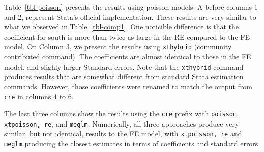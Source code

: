 \documentclass[bib]{statapress}
\begin{document}
Table~\ref{tbl-poisson} presents the results using poisson models. A
before columns 1 and 2, represent Stata's official implementation. These
results are very similar to what we observed in Table~\ref{tbl-comp1}.
One noticible difference is that the coefficient for south is more than
twice as large in the RE compared to the FE model. On Column 3, we
present the results using \texttt{xthybrid} (community contributed
command). The coefficients are almost identical to those in the FE
model, and slighly larger Standard errors. Note that the
\texttt{xthybrid} command produces results that are somewhat different
from standard Stata estimation commands. However, those coefficients
were renamed to match the output from \texttt{cre} in columns 4 to 6.

The last three columns show the results using the \texttt{cre} prefix
with \texttt{poisson}, \texttt{xtpoisson,\ re}, and \texttt{meglm}.
Numerically, all three approaches produce very similar, but not
identical, results to the FE model, with \texttt{xtpoisson,\ re} and
\texttt{meglm} producing the closest estimates in terms of coefficients
and standard errors.
\end{document}
